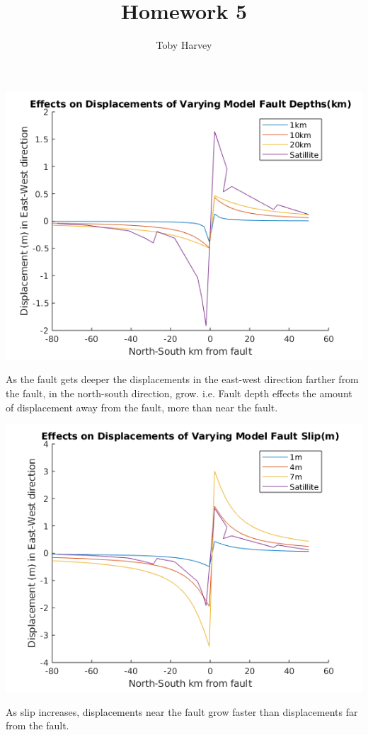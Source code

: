 \documentclass{article}
\begin{document}
\title{Homework 5}
\author{Toby Harvey}
\maketitle

\includegraphics[width=\linewidth]{fault_depth.png}

As the fault gets deeper the displacements in the east-west direction farther from the fault, in the north-south direction, grow. i.e. Fault depth effects the amount of displacement away from the fault, more than near the fault.

\includegraphics[width=\linewidth]{fault_slip.png}

As slip increases, displacements near the fault grow faster than  displacements far from the fault. 
\end{document}
